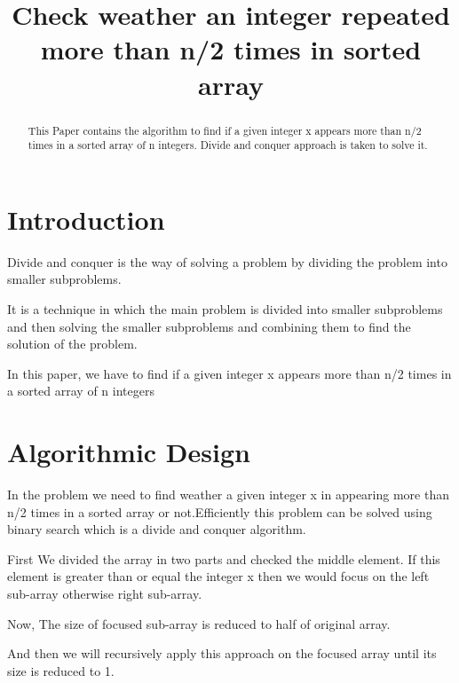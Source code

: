 \documentclass[conference]{IEEEtran}
\begin{document}
\title{ Check weather an integer repeated more than n/2 times in sorted array\\
}
\author{
\and
{}
\and
{}
}

\maketitle

\begin{abstract}
This Paper contains the algorithm to find if a given integer x appears more than n/2 times in a sorted array of n integers. Divide and conquer approach is taken to solve it.
\end{abstract}

\section{Introduction}
Divide and conquer is the way of solving a problem by dividing the problem into smaller subproblems.

It is a technique in which the main problem is divided into smaller subproblems and then solving the smaller subproblems and combining them to find the solution of the problem.

In this paper, we have to find if a given integer x appears more than n/2 times in a sorted array of n integers


\section{Algorithmic Design}

In the problem we need to find weather a given integer x in appearing more than n/2 times in a sorted array or not.Efficiently this problem can be solved using binary search which is a divide and conquer algorithm.

First We divided the array in two parts and checked the middle element.
If this element is greater than or equal the integer x then we would focus on the left sub-array otherwise right sub-array.

Now, The size of focused sub-array is reduced to half of original array.

And then we will recursively apply this approach on the focused array until its size is reduced to 1. 
\end{document}
